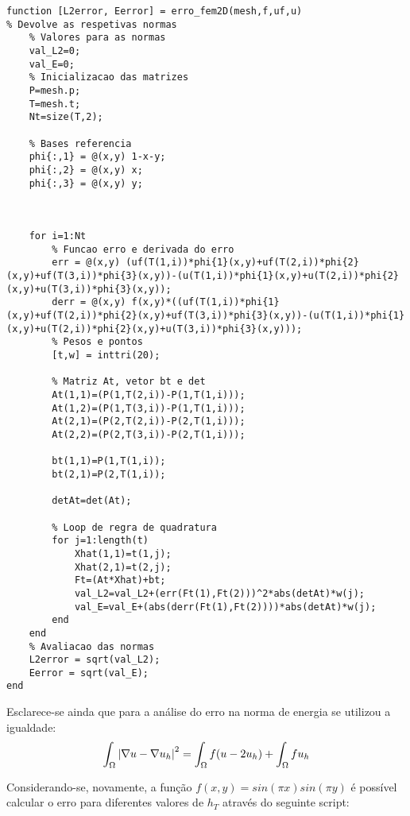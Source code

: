 \documentclass{article}
\theoremstyle{definition}
\theoremstyle{plain}
\numberwithin{equation}{section}
\newcommand{\tab}{\hspace{10mm}}
\begin{document}
\begin{lstlisting}[frame=single]
 function [L2error, Eerror] = erro_fem2D(mesh,f,uf,u)
% Devolve as respetivas normas
    % Valores para as normas
    val_L2=0;
    val_E=0;
    % Inicializacao das matrizes 
    P=mesh.p;
    T=mesh.t;
    Nt=size(T,2);

    % Bases referencia 
    phi{:,1} = @(x,y) 1-x-y;
    phi{:,2} = @(x,y) x;
    phi{:,3} = @(x,y) y;
    
    

    for i=1:Nt
        % Funcao erro e derivada do erro
        err = @(x,y) (uf(T(1,i))*phi{1}(x,y)+uf(T(2,i))*phi{2}(x,y)+uf(T(3,i))*phi{3}(x,y))-(u(T(1,i))*phi{1}(x,y)+u(T(2,i))*phi{2}(x,y)+u(T(3,i))*phi{3}(x,y));
        derr = @(x,y) f(x,y)*((uf(T(1,i))*phi{1}(x,y)+uf(T(2,i))*phi{2}(x,y)+uf(T(3,i))*phi{3}(x,y))-(u(T(1,i))*phi{1}(x,y)+u(T(2,i))*phi{2}(x,y)+u(T(3,i))*phi{3}(x,y)));
        % Pesos e pontos
        [t,w] = inttri(20);

        % Matriz At, vetor bt e det 
        At(1,1)=(P(1,T(2,i))-P(1,T(1,i)));
        At(1,2)=(P(1,T(3,i))-P(1,T(1,i)));
        At(2,1)=(P(2,T(2,i))-P(2,T(1,i)));
        At(2,2)=(P(2,T(3,i))-P(2,T(1,i)));
    
        bt(1,1)=P(1,T(1,i));
        bt(2,1)=P(2,T(1,i));

        detAt=det(At);
        
        % Loop de regra de quadratura
        for j=1:length(t)
            Xhat(1,1)=t(1,j);
            Xhat(2,1)=t(2,j);
            Ft=(At*Xhat)+bt;
            val_L2=val_L2+(err(Ft(1),Ft(2)))^2*abs(detAt)*w(j);
            val_E=val_E+(abs(derr(Ft(1),Ft(2))))*abs(detAt)*w(j);
        end
    end
    % Avaliacao das normas
    L2error = sqrt(val_L2);
    Eerror = sqrt(val_E);
end

\end{lstlisting}

\vspace{1mm}

Esclarece-se ainda que para a análise do erro na norma de energia se utilizou a igualdade:
\begin{equation*}
    \int_\Omega \abs{\nabla u - \nabla u_h}^2 = \int_\Omega f(u-2u_h) + \int_\Omega fu_h
\end{equation*}

\tab Considerando-se, novamente, a função $f(x,y)=sin(\pi x)sin(\pi y)$ é possível calcular o erro para diferentes valores de $h_T$ através do seguinte script:

\vspace{5mm}
\end{document}
